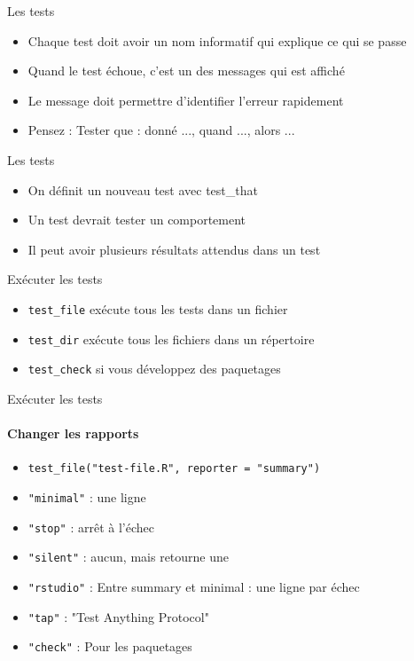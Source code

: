 \documentclass[11pt]{beamer}
\begin{document}
\begin{frame}{Les tests}
\begin{itemize}
\item Chaque test doit avoir un nom informatif qui explique ce qui se passe
\item Quand le test échoue, c'est un des messages qui est affiché
\item Le message doit permettre d'identifier l'erreur rapidement
\item Pensez : Tester que : donné ..., quand ..., alors ...
\end{itemize}
\end{frame}

\begin{frame}{Les tests}
\begin{itemize}
\item On définit un nouveau test avec test\_that
\item Un test devrait tester un comportement
\item Il peut avoir plusieurs résultats attendus dans un test
\end{itemize}
\end{frame}

\begin{frame}{Exécuter les tests}
\begin{itemize}
\item {\texttt{test\_file}} exécute tous les tests dans un fichier
\item {\texttt{test\_dir}} exécute tous les fichiers dans un répertoire
\item \texttt{test\_check} si vous développez des paquetages
\end{itemize}
\end{frame}

\begin{frame}{Exécuter les tests}
\framesubtitle{Changer les rapports}
\begin{itemize}
\item \texttt{test\_file("test-file.R", reporter = "summary")}
\item \texttt{"minimal"} : une ligne
\item \texttt{"stop"} : arrêt à l'échec
\item \texttt{"silent"} : aucun, mais retourne une
\item \texttt{"rstudio"} : Entre summary et minimal : une ligne par échec
\item \texttt{"tap"} : "Test Anything Protocol"
\item \texttt{"check"} : Pour les paquetages
\end{itemize}
\end{frame}
\end{document}
